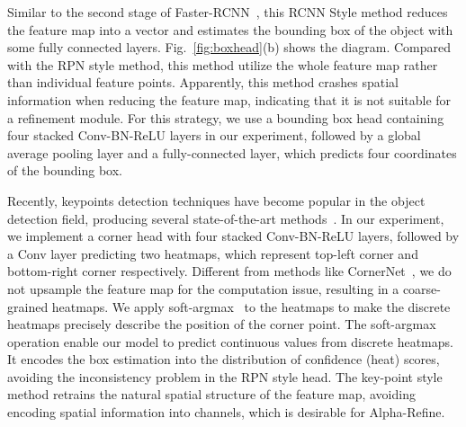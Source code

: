 \documentclass[final]{cvpr}
\begin{document}
Similar to the second stage of Faster-RCNN~\cite{FasterRCNN}, this RCNN Style method reduces the feature map into a vector and 
estimates the bounding box of the object with some fully connected layers. 
Fig.~\ref{fig:boxhead}(b) shows the diagram. 
Compared with the RPN style method, this method utilize the whole feature map rather than individual feature points. 
Apparently, this method crashes spatial information when reducing the feature map, indicating that it is not suitable
for a refinement module.
For this strategy, we use a bounding box head containing four stacked Conv-BN-ReLU layers in our experiment, 
followed by a global average pooling layer and a fully-connected layer, which predicts four coordinates of the bounding box. 

 Recently, keypoints detection techniques have become popular in the object detection field, 
producing several state-of-the-art methods~\cite{CornerNet,CenterNet,centernet-triplet,extremenet}. 
In our experiment, we implement a corner head with four stacked Conv-BN-ReLU layers, 
followed by a Conv layer predicting two heatmaps, which represent top-left corner and bottom-right corner respectively. 
Different from methods like CornerNet~\cite{CornerNet}, we do not upsample the feature map for the computation issue, 
resulting in a coarse-grained heatmaps.
We apply soft-argmax~\cite{soft-argmax} to the heatmaps to make the discrete heatmaps precisely describe the position of the corner point.
The soft-argmax operation enable our model to predict continuous values from discrete heatmaps. It encodes the box estimation into the distribution of confidence (heat) scores, avoiding the inconsistency problem in the RPN style head. The key-point style method retrains the natural spatial structure of the feature map, avoiding encoding spatial information into channels, which is desirable for Alpha-Refine. 
\end{document}

